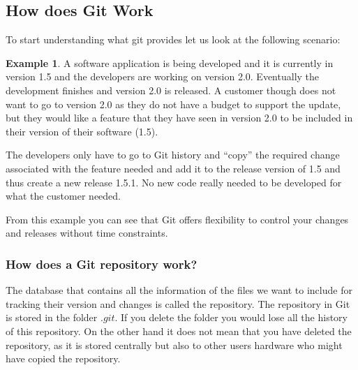 \documentclass[
]{book}
\theoremstyle{definition}
\theoremstyle{definition}
\newtheorem{example}{Example}[chapter]
\theoremstyle{definition}
\theoremstyle{remark}
\begin{document}
\hypertarget{how-does-git-work}{%
\subsection*{How does Git Work}\label{how-does-git-work}}

To start understanding what git provides let us look at the following scenario:
\begin{example}
\protect\hypertarget{exm:unnamed-chunk-4}{}{\label{exm:unnamed-chunk-4} }A software application is being developed and it is currently in version 1.5 and the developers are working on version 2.0.
Eventually the development finishes and version 2.0 is released. A customer though does not want to go to version 2.0 as they do not have a budget to support the update, but they would like a feature that they have seen in version 2.0 to be included in their version of their software (1.5).

The developers only have to go to Git history and ``copy'' the required change associated with the feature needed and add it to the release version of 1.5 and thus create a new release 1.5.1.
No new code really needed to be developed for what the customer needed.
\end{example}
From this example you can see that Git offers flexibility to control your changes and releases without time constraints.

\hypertarget{how-does-a-git-repository-work}{%
\subsubsection*{How does a Git repository work?}\label{how-does-a-git-repository-work}}

The database that contains all the information of the files we want to include for tracking their version and changes is called the repository. The repository in Git is stored in the folder \(.git\). If you delete the folder you would lose all the history of this repository. On the other hand it does not mean that you have deleted the repository, as it is stored centrally but also to other users hardware who might have copied the repository.
\end{document}
